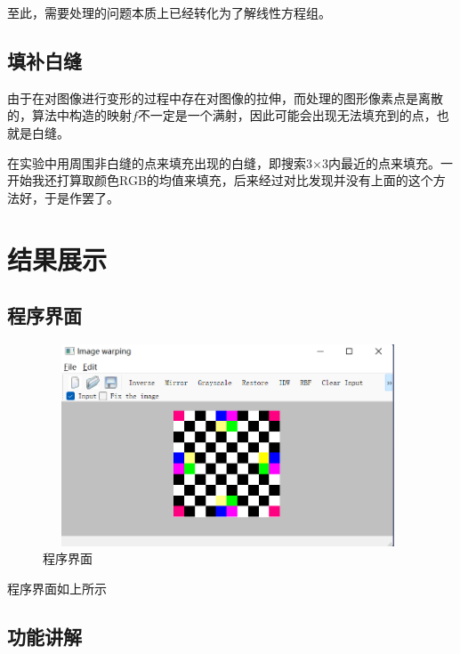 \documentclass{article}
\begin{document}
	至此，需要处理的问题本质上已经转化为了解线性方程组。

	\subsection{填补白缝}
		由于在对图像进行变形的过程中存在对图像的拉伸，而处理的图形像素点是离散的，算法中构造的映射$f$不一定是一个满射，因此可能会出现无法填充到的点，也就是白缝。
	
	在实验中用周围非白缝的点来填充出现的白缝，即搜索3$\times$3内最近的点来填充。一开始我还打算取颜色RGB的均值来填充，后来经过对比发现并没有上面的这个方法好，于是作罢了。

	
	\section{结果展示}
	 \subsection{程序界面}
	
	   	\begin{figure}[H]
		\begin{center}
			
			\includegraphics[width=11cm,height=6cm]{jiemian}
			
			\caption{程序界面} \label{jiemian.label}
		\end{center}
	\end{figure}

    程序界面如上所示
    
    \subsection{功能讲解}
    
\end{document}
